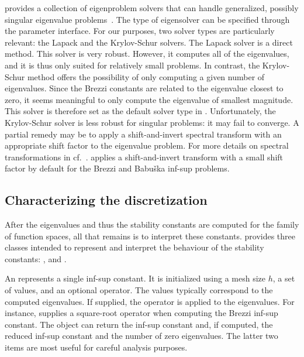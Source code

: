 \slepc{} provides a collection of eigenproblem solvers that can handle
generalized, possibly singular eigenvalue
problems~\cite{HernandezRomanVidal2005, slepc_users_manual}. The type
of eigensolver can be specified through the \dolfin{} parameter
interface. For our purposes, two solver types are particularly
relevant: the Lapack and the Krylov-Schur solvers.  The Lapack solver
is a direct method. This solver is very robust. However, it computes
all of the eigenvalues, and it is thus only suited for relatively
small problems. In contrast, the Krylov-Schur method offers the
possibility of only computing a given number of eigenvalues. Since the
Brezzi constants are related to the eigenvalue closest to zero, it
seems meaningful to only compute the eigenvalue of smallest
magnitude. This solver is therefore set as the default solver type in
\rognesascot. Unfortunately, the Krylov-Schur solver is less robust
for singular problems: it may fail to converge. A partial remedy may
be to apply a shift-and-invert spectral transform with an appropriate
shift factor to the eigenvalue problem. For more details on spectral
transformations in \slepc{}
cf.~\cite{HernandezRomanRomeroEtAl2009}. \rognesascot{} applies a
shift-and-invert transform with a small shift factor by default for
the Brezzi and Babu\v ska inf-sup problems.

\subsection{Characterizing the discretization}

After the eigenvalues and thus the stability constants are computed
for the family of function spaces, all that remains is to interpret
these constants. \rognesascot{} provides three classes intended to represent
and interpret the behaviour of the stability constants:
,  and
.

An  represents a single inf-sup
constant. It is initialized using a mesh size $h$, a set of values,
and an optional operator. The values typically correspond to the
computed eigenvalues. If supplied, the operator is applied to the
eigenvalues.  For instance, \rognesascot{} supplies a square-root operator
when computing the Brezzi inf-sup constant. The object can return the
inf-sup constant and, if computed, the reduced inf-sup constant and
the number of zero eigenvalues. The latter two items are most useful
for careful analysis purposes.

